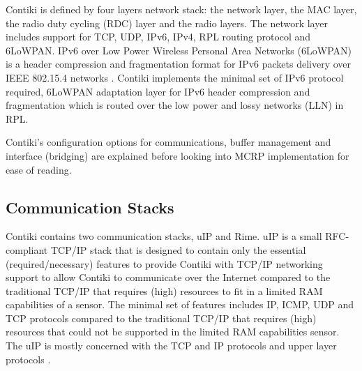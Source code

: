 Contiki is defined by four layers network stack: the network layer, the MAC layer, the radio duty cycling (RDC) layer and the radio layers. The network layer includes support for TCP, UDP, IPv6, IPv4, RPL routing protocol and 6LoWPAN. IPv6 over Low Power Wireless Personal Area Networks (6LoWPAN) is a header compression and fragmentation format for IPv6 packets delivery over IEEE 802.15.4 networks \cite{6lowpan}. Contiki implements the minimal set of IPv6 protocol required, 6LoWPAN adaptation layer for IPv6 header compression and fragmentation which is routed over the low power and lossy networks (LLN) in RPL.

Contiki's configuration options for communications, buffer management and interface (bridging) are explained before looking into MCRP implementation for ease of reading.



\subsection{Communication Stacks}
Contiki contains two communication stacks, uIP and Rime.
uIP \cite{uip} is a small RFC-compliant TCP/IP stack that is designed to contain only the essential (required/necessary) features to provide Contiki with TCP/IP networking support to allow Contiki to communicate over the Internet compared to the traditional TCP/IP that requires (high) resources to fit in a limited RAM capabilities of a sensor. The minimal set of features includes IP, ICMP, UDP and TCP protocols compared to the traditional TCP/IP that requires (high) resources that could not be supported in the limited RAM capabilities sensor. The uIP is mostly concerned with the TCP and IP protocols and upper layer protocols \cite{contikiDoc, contikiUIP}. 

